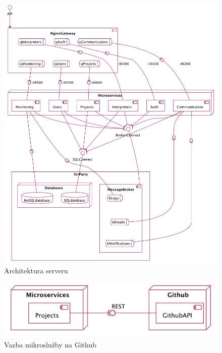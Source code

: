 \begin{figure}[htbp]
   \centering
   \includegraphics[max width=\textwidth]{assets/draft-server-arch}
   \caption{Architektura serveru}\label{fig:server-arch}
\end{figure}

\begin{figure}[htbp]
   \centering
   \includegraphics[max width=\textwidth]{assets/draft-be-github}
   \caption{Vazba mikroslužby na Github}\label{fig:server-github}
\end{figure}


